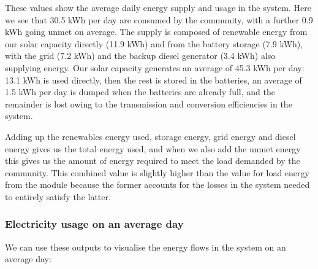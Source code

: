 \documentclass[letterpaper,10pt,english]{sphinxmanual}
\begin{document}
\begin{sphinxVerbatim}[commandchars=\\\{\}]
                
                     
           
           
                      
                    
       
                    
 
\end{sphinxVerbatim}

\sphinxAtStartPar
These values show the average daily energy supply and usage in the
system. Here we see that 30.5 kWh per day are consumed by the community,
with a further 0.9 kWh going unmet on average. The supply is composed of
renewable energy from our solar capacity directly (11.9 kWh) and from
the battery storage (7.9 kWh), with the grid (7.2 kWh) and the backup
diesel generator (3.4 kWh) also supplying energy. Our solar capacity
generates an average of 45.3 kWh per day: 13.1 kWh is used directly,
then the rest is stored in the batteries, an average of 1.5 kWh per day
is dumped when the batteries are already full, and the remainder is lost
owing to the transmission and conversion efficiencies in the system.

\sphinxAtStartPar
Adding up the renewables energy used, storage energy, grid energy and
diesel energy gives us the total energy used, and when we also add the
unmet energy this gives us the amount of energy required to meet the
load demanded by the community. This combined value is slightly higher
than the value for load energy from the  module because the former
accounts for the losses in the system needed to entirely satisfy the
latter.


\subsubsection{Electricity usage on an average day}
\label{\detokenize{energy_system_simulation:electricity-usage-on-an-average-day}}
\sphinxAtStartPar
We can use these outputs to visualise the energy flows in the system on
an average day:
\end{document}
